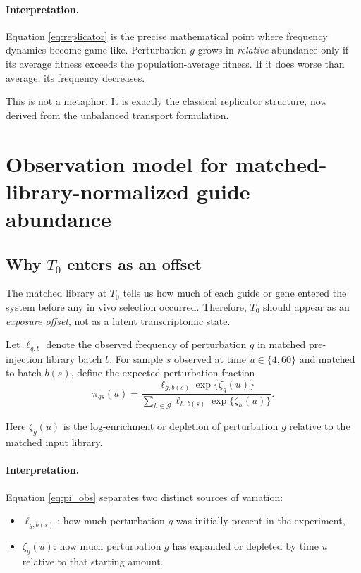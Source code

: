 \documentclass[11pt]{article}
\newcommand{\G}{\mathcal{G}}
\newcommand{\1}{\mathbf{1}}
\newcommand{\Tzero}{T_0}
\theoremstyle{plain}
\begin{document}
\paragraph{Interpretation.}
Equation \eqref{eq:replicator} is the precise mathematical point where frequency dynamics become game-like. Perturbation $g$ grows in \emph{relative} abundance only if its average fitness exceeds the population-average fitness. If it does worse than average, its frequency decreases.

This is not a metaphor. It is exactly the classical replicator structure, now derived from the unbalanced transport formulation.

\section{Observation model for matched-library-normalized guide abundance}

\subsection{Why $\Tzero$ enters as an offset}

The matched library at $\Tzero$ tells us how much of each guide or gene entered the system before any in vivo selection occurred. Therefore, $\Tzero$ should appear as an \emph{exposure offset}, not as a latent transcriptomic state.

Let $\ell_{g,b}$ denote the observed frequency of perturbation $g$ in matched pre-injection library batch $b$. For sample $s$ observed at time $u\in\{4,60\}$ and matched to batch $b(s)$, define the expected perturbation fraction
\begin{equation}
\pi_{gs}(u)
=
\frac{\ell_{g,b(s)}\exp\{\zeta_g(u)\}}
{\sum_{h\in\G}\ell_{h,b(s)}\exp\{\zeta_h(u)\}}.
\label{eq:pi_obs}
\end{equation}

Here $\zeta_g(u)$ is the log-enrichment or depletion of perturbation $g$ relative to the matched input library.

\paragraph{Interpretation.}
Equation \eqref{eq:pi_obs} separates two distinct sources of variation:
\begin{itemize}
    \item $\ell_{g,b(s)}$: how much perturbation $g$ was initially present in the experiment,
    \item $\zeta_g(u)$: how much perturbation $g$ has expanded or depleted by time $u$ relative to that starting amount.
\end{itemize}
\end{document}

